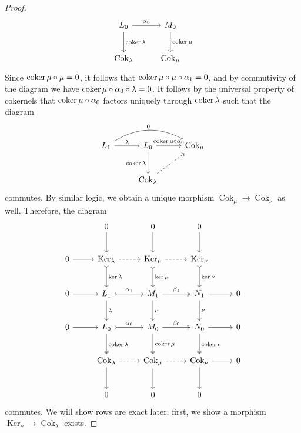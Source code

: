 \begin{proof}
\[\begin{tikzcd}[row sep = 2.5em, column sep = 2.5em]
		L_0\arrow[r, "\alpha _0"]\arrow[d, "\coker \lambda "]&M_0\arrow[d, "\coker \mu "]\\
		\operatorname{Cok} _\lambda &\operatorname{Cok} _\mu 
	\end{tikzcd}\]
	Since $\operatorname{coker} \mu \circ \mu =0$, it follows that $\operatorname{coker} \mu \circ \mu \circ \alpha _1=0$, and by commutivity of the diagram we have $\operatorname{coker} \mu \circ \alpha _0\circ \lambda =0$. It follows by the universal property of cokernels that $\operatorname{coker} \mu \circ \alpha _0$ factors uniquely through $\operatorname{coker} \lambda $ such that the diagram
	\[\begin{tikzcd}[row sep = 2.5em, column sep = 2.5em]
		L_1\arrow[r, "\lambda "]\arrow[rr, bend left, "0"]&L_0\arrow[r, "\coker \mu \circ \alpha _0"]\arrow[d, "\coker \lambda "']&\operatorname{Cok} _\mu \\
						       &\operatorname{Cok} _\lambda \arrow[ur, dashed]
	\end{tikzcd}\]
	commutes. By similar logic, we obtain a unique morphism $\operatorname{Cok} _\mu \to \operatorname{Cok} _\nu $ as well. Therefore, the diagram
	\[\begin{tikzcd}[row sep = 2.5em, column sep = 2.5em]
		&0\arrow[d]&0\arrow[d]&0\arrow[d]\\
		0\arrow[r]&\operatorname{Ker}_\lambda \arrow[d, tail, "\ker \lambda "]\arrow[r, dashed]&\operatorname{Ker} _\mu \arrow[d, tail, "\ker \mu "]\arrow[r, dashed]&\operatorname{Ker} _\nu \arrow[d, tail, "\ker \nu "]\\
		0\arrow[r]&L_1\arrow[r, tail, "\alpha _1"]\arrow[d, "\lambda "]&M_1\arrow[r, two heads, "\beta _1"]\arrow[d, "\mu "]&N_1\arrow[r]\arrow[d, "\nu "]&0\\
		0\arrow[r]&L_0\arrow[d, two heads, "\coker \lambda "]\arrow[r, tail, "\alpha _0"]&M_0\arrow[d, two heads, "\coker \mu "]\arrow[r, two heads,"\beta _0"]&N_0\arrow[d, two heads, "\coker \nu "]\arrow[r]&0\\
			  &\operatorname{Cok} _\lambda \arrow[d]\arrow[r, dashed]&\operatorname{Cok} _\mu \arrow[d]\arrow[r, dashed]&\operatorname{Cok} _\nu \arrow[d]\arrow[r]&0\\
						     &0&0&0
	\end{tikzcd}\]
	commutes. We will show rows are exact later; first, we show a morphism $\operatorname{Ker} _\nu \to \operatorname{Cok} _\lambda $ exists.


\end{proof}
